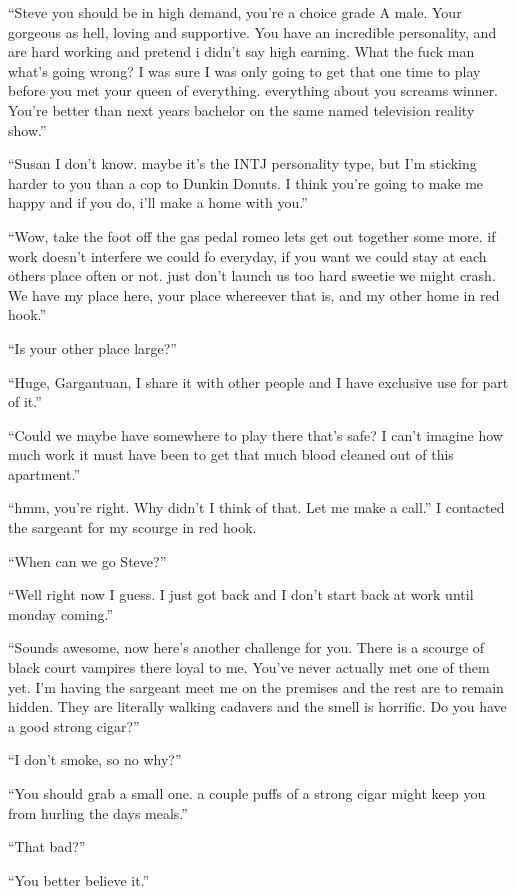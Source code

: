 ``Steve you should be in high demand, you're a choice grade A male. Your gorgeous as hell, loving and supportive. You have an incredible personality, and are hard working and pretend i didn't say high earning. What the fuck man what's going wrong? I was sure I was only going to get that one time to play before you met your queen of everything. everything about you screams winner. You're better than next years bachelor on the same named television reality show.''

``Susan I don't know. maybe it's the INTJ personality type, but I'm sticking harder to you than a cop to Dunkin Donuts. I think you're going to make me happy and if you do, i'll make a home with you.''

``Wow, take the foot off the gas pedal romeo lets get out together some more. if work doesn't interfere we could fo everyday, if you want we could stay at each others place often or not. just don't launch us too hard sweetie we might crash. We have my place here, your place whereever that is, and my other home in red hook.''

``Is your other place large?''

``Huge, Gargantuan, I share it with other people and I have exclusive use for part of it.''

``Could we maybe have somewhere to play there that's safe? I can't imagine how much work it must have been to get that much blood cleaned out of this apartment.''

``hmm, you're right. Why didn't I think of that. Let me make a call.''
I contacted the sargeant for my scourge in red hook.

``When can we go Steve?''

``Well right now I guess. I just got back and I don't start back at work until monday coming.''

``Sounds awesome, now here's another challenge for you. There is a scourge of black court vampires there loyal to me. You've never actually met one of them yet. I'm having the sargeant meet me on the premises and the rest are to remain hidden. They are literally walking cadavers and the smell is horrific. Do you have a good strong cigar?''

``I don't smoke, so no why?''

``You should grab a small one. a couple puffs of a strong cigar might keep you from hurling the days meals.''

``That bad?''

``You better believe it.''

